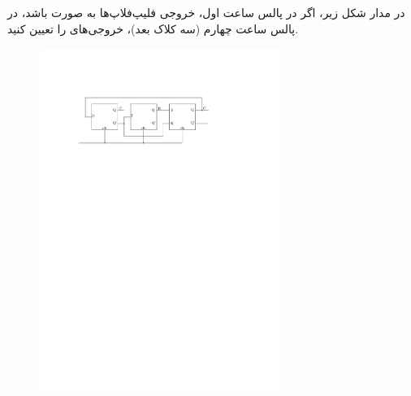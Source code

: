 
در مدار شکل زیر، اگر در پالس ساعت اول، خروجی فلیپ‌فلاپ‌ها به صورت  باشد، در پالس ساعت چهارم (سه کلاک بعد)، خروجی‌های  را تعیین کنید.


\begin{figure}[h]
	\centering
	\includegraphics[width=0.7\textwidth]{fig/Q_basic5.pdf}
	\label{fig:Q_basic_5}
\end{figure}